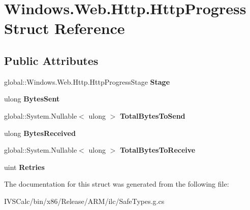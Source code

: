 \hypertarget{struct_windows_1_1_web_1_1_http_1_1_http_progress}{}\section{Windows.\+Web.\+Http.\+Http\+Progress Struct Reference}
\label{struct_windows_1_1_web_1_1_http_1_1_http_progress}
\subsection*{Public Attributes}
\begin{DoxyCompactItemize}
\item 
\mbox{\label{struct_windows_1_1_web_1_1_http_1_1_http_progress_a84b733dc51e8597c3589fe2b79eabef4}} 
global\+::\+Windows.\+Web.\+Http.\+Http\+Progress\+Stage {\bfseries Stage}
\item 
\mbox{\label{struct_windows_1_1_web_1_1_http_1_1_http_progress_a392236095fc02556568a433532c35da8}} 
ulong {\bfseries Bytes\+Sent}
\item 
\mbox{\label{struct_windows_1_1_web_1_1_http_1_1_http_progress_ab5c9656f5d0f54f5be4367abb9430ee6}} 
global\+::\+System.\+Nullable$<$ ulong $>$ {\bfseries Total\+Bytes\+To\+Send}
\item 
\mbox{\label{struct_windows_1_1_web_1_1_http_1_1_http_progress_a744452cc2384ff90749741c305746caa}} 
ulong {\bfseries Bytes\+Received}
\item 
\mbox{\label{struct_windows_1_1_web_1_1_http_1_1_http_progress_a3fa4e00d526643b3ed0feb77e2a4bc4f}} 
global\+::\+System.\+Nullable$<$ ulong $>$ {\bfseries Total\+Bytes\+To\+Receive}
\item 
\mbox{\label{struct_windows_1_1_web_1_1_http_1_1_http_progress_ab94cd54a63868ecd51b29e505c0b901f}} 
uint {\bfseries Retries}
\end{DoxyCompactItemize}


The documentation for this struct was generated from the following file\+:\begin{DoxyCompactItemize}
\item 
I\+V\+S\+Calc/bin/x86/\+Release/\+A\+R\+M/ilc/Safe\+Types.\+g.\+cs\end{DoxyCompactItemize}
